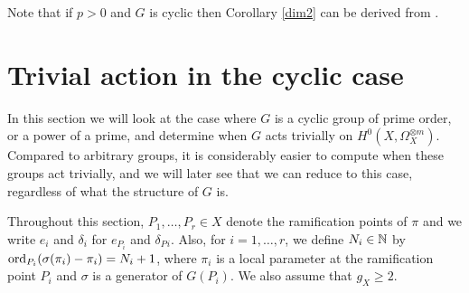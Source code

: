     \begin{rem}
    Note that if $p>0$ and $G$ is cyclic then Corollary \ref{dim2} can be derived from \cite[Prop. 6.]{kako}.
    \end{rem}



\section{Trivial action in the cyclic case}

In this section we will look at the case where $G$ is a cyclic group of prime order, or a power of a prime, and determine when $G$ acts trivially on $H^0(X,\Omega_X^{\otimes m})$.
Compared to arbitrary groups, it is considerably easier to compute when these groups act trivially, and we will later see that we can reduce to this case, regardless of what the structure of $G$ is.


Throughout this section, $P_1,\ldots ,P_r \in X$ denote the ramification points of $\pi$ and we write $e_i$ and $\delta_i$ for $e_{P_i}$ and $\delta_P{_i}$.
Also, for $i=1, \ldots, r$, we define $N_i \in {\mathbb N}$ by $\operatorname{ord}_{P_i}(\sigma(\pi_i) - \pi_i) = N_i +1$, where $\pi_i$ is a local parameter at the ramification point $P_i$ and $\sigma$ is a generator of $G(P_i)$. 
We also assume that $g_X \geq 2$.


